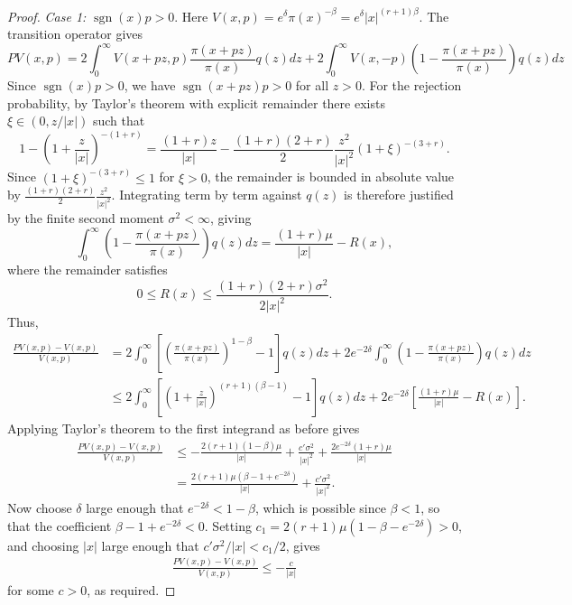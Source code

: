 \documentclass{article}
\theoremstyle{definition}
\theoremstyle{plain}
\begin{document}
\begin{proof}
\textit{Case 1:} $\operatorname{sgn}(x)p > 0$.  Here $V(x,p) = e^\delta \pi(x)^{-\beta} = e^\delta |x|^{(r+1)\beta}$. The transition operator gives
\begin{equation}
    PV(x,p) = 2\int_0^\infty V(x+pz,p)\frac{\pi(x+pz)}{\pi(x)}q(z)dz + 2\int_0^\infty V(x,-p)\left(1-\frac{\pi(x+pz)}{\pi(x)} \right)q(z)dz
\end{equation}
Since $\operatorname{sgn}(x)p>0$, we have $\operatorname{sgn}(x+pz)p>0$ for all $z>0$. For the rejection probability, by Taylor's theorem with explicit remainder there exists $\xi \in (0, z/|x|)$ such that
\begin{equation*}
    1 - \left(1+\frac{z}{|x|}\right)^{-(1+r)} = \frac{(1+r)z}{|x|} - \frac{(1+r)(2+r)}{2}\frac{z^2}{|x|^2}\left(1+\xi\right)^{-(3+r)}.
\end{equation*}
Since $(1+\xi)^{-(3+r)} \leq 1$ for $\xi > 0$, the remainder is bounded in absolute value by $\frac{(1+r)(2+r)}{2}\frac{z^2}{|x|^2}$. Integrating term by term against $q(z)$ is therefore justified by the finite second moment $\sigma^2 < \infty$, giving
\begin{equation*}
    \int_0^\infty \left(1-\frac{\pi(x+pz)}{\pi(x)}\right)q(z)dz = \frac{(1+r)\mu}{|x|} - R(x),
\end{equation*}
where the remainder satisfies
\begin{equation*}
    0 \leq R(x) \leq \frac{(1+r)(2+r)\sigma^2}{2|x|^2}.
\end{equation*}
Thus,
\begin{equation}
\begin{aligned}
    \frac{PV(x,p)-V(x,p)}{V(x,p)} 
    &= 2\int_0^\infty \left[\left(\frac{\pi(x+pz)}{\pi(x)}\right)^{1-\beta}-1\right]q(z)dz + 2e^{-2\delta}\int_0^\infty \left(1-\frac{\pi(x+pz)}{\pi(x)}\right) q(z) dz\\
    &\le 2\int_0^\infty\left[\left(1+\frac{z}{|x|}\right)^{(r+1)(\beta-1)}-1\right]q(z)dz + 2e^{-2\delta}\left[\frac{(1+r)\mu}{|x|} - R(x)\right].
\end{aligned}
\end{equation}
Applying Taylor's theorem to the first integrand as before gives
\begin{align}
    \frac{PV(x,p)-V(x,p)}{V(x,p)}  &\le -\frac{2(r+1)(1-\beta)\mu}{|x|} + \frac{c'\sigma^2}{|x|^2} + \frac{2e^{-2\delta}(1+r)\mu}{|x|}\\
    &= \frac{2(r+1)\mu(\beta - 1 + e^{-2\delta})}{|x|} + \frac{c'\sigma^2}{|x|^2}.
\end{align}
Now choose $\delta$ large enough that $e^{-2\delta} < 1-\beta$, which is possible since $\beta < 1$, so that the coefficient $\beta - 1 + e^{-2\delta} < 0$. Setting $c_1 = 2(r+1)\mu(1-\beta-e^{-2\delta}) > 0$, and choosing $|x|$ large enough that $c'\sigma^2/|x| < c_1/2$, gives
\begin{align}
    \frac{PV(x,p)-V(x,p)}{V(x,p)} \leq -\frac{c}{|x|}
\end{align}
for some $c > 0$, as required.


\end{proof}
\end{document}
